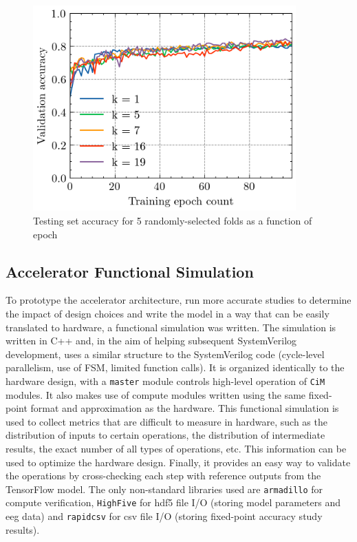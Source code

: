 \begin{figure}
    \centering
    \caption{Testing set accuracy for 5 randomly-selected folds as a function of epoch}
    \includegraphics[width=0.9\textwidth]{assets/acc_vs_epoch/acc_vs_epoch.png}
\end{figure}
\label{fig:acc_vs_epoch}
\subsection{Accelerator Functional Simulation}
To prototype the accelerator architecture, run more accurate studies to determine the impact of design choices and write the model in a way that can be easily translated to 
hardware, a functional simulation was written. The simulation is written in C++ and, in the aim of helping subsequent SystemVerilog development, uses a similar structure to
the SystemVerilog code (cycle-level parallelism, use of FSM, limited function calls). It is organized identically to the hardware design, with a \texttt{master} module controls
high-level operation of \texttt{CiM} modules. It also makes use of compute modules written using the same fixed-point format and approximation as the hardware. This functional 
simulation is used to collect metrics that are difficult to measure in hardware, such as the distribution of inputs to certain operations, the distribution of intermediate results,
the exact number of all types of operations, etc. This information can be used to optimize the hardware design. Finally, it provides an easy way to validate the operations by
cross-checking each step with reference outputs from the TensorFlow model. The only non-standard libraries used are \texttt{armadillo} for compute verification, \texttt{HighFive}
for \ac{hdf5} file I/O (storing model parameters and \ac{eeg} data) and \texttt{rapidcsv} for \ac{csv} file I/O (storing fixed-point accuracy study results).

